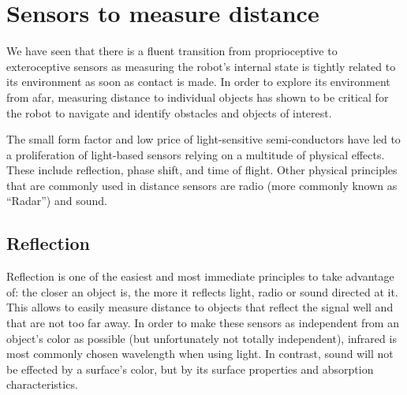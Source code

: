 

\section{Sensors to measure distance}
We have seen that there is a fluent transition from proprioceptive to exteroceptive sensors as measuring the robot's internal state is tightly related to its environment as soon as contact is made. In order to explore its environment from afar, measuring distance to individual objects has shown to be critical for the robot to navigate and identify obstacles and objects of interest. 


The small form factor and low price of light-sensitive semi-conductors have led to a proliferation of light-based sensors relying on a multitude of physical effects. These include reflection, phase shift, and time of flight. Other physical principles that are commonly used in distance sensors are radio (more commonly known as ``Radar'') and sound.   

\subsection{Reflection}
Reflection is one of the easiest and most immediate principles to take advantage of: the closer an object is, the more it reflects light, radio or sound directed at it. This allows to easily measure distance to objects that reflect the signal well and that are not too far away. In order to make these sensors as independent from an object's color as possible (but unfortunately not totally independent), infrared is most commonly chosen wavelength when using light. In contrast, sound will not be effected by a surface's color, but by its surface properties and absorption characteristics. 

